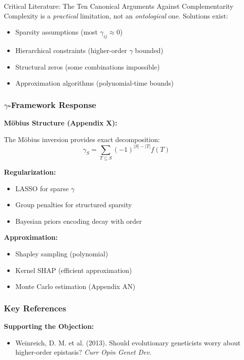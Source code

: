 \begin{chapter}{Critical Literature: The Ten Canonical Arguments Against Complementarity}
Complexity is a \textit{practical} limitation, not an \textit{ontological} one. Solutions exist:
\begin{itemize}[noitemsep]
    \item Sparsity assumptions (most $\gamma_{ij} \approx 0$)
    \item Hierarchical constraints (higher-order $\gamma$ bounded)
    \item Structural zeros (some combinations impossible)
    \item Approximation algorithms (polynomial-time bounds)
\end{itemize}

\subsubsection{$\gamma$-Framework Response}

\textbf{Möbius Structure (Appendix X):}

The Möbius inversion provides exact decomposition:
\[
\gamma_S = \sum_{T \subseteq S} (-1)^{|S|-|T|} f(T)
\]

\textbf{Regularization:}
\begin{itemize}[noitemsep]
    \item LASSO for sparse $\gamma$
    \item Group penalties for structured sparsity
    \item Bayesian priors encoding decay with order
\end{itemize}

\textbf{Approximation:}
\begin{itemize}[noitemsep]
    \item Shapley sampling (polynomial)
    \item Kernel SHAP (efficient approximation)
    \item Monte Carlo estimation (Appendix AN)
\end{itemize}

\subsubsection{Key References}

\textbf{Supporting the Objection:}
\begin{itemize}[noitemsep]
    \item Weinreich, D. M. et al. (2013). Should evolutionary geneticists worry about higher-order epistasis? \textit{Curr Opin Genet Dev}.
\end{itemize}


\end{chapter}
